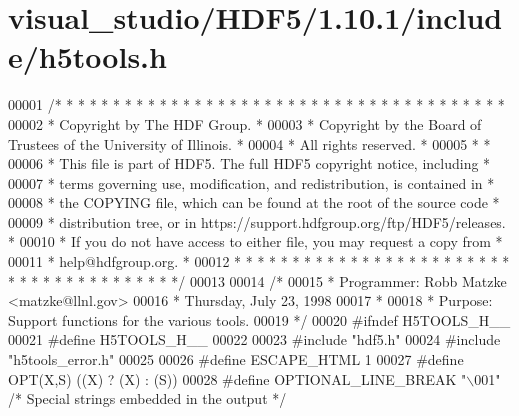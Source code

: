 \hypertarget{visual__studio_2_h_d_f5_21_810_81_2include_2h5tools_8h_source}{}\section{visual\+\_\+studio/\+H\+D\+F5/1.10.1/include/h5tools.h}
\label{visual__studio_2_h_d_f5_21_810_81_2include_2h5tools_8h_source}

\begin{DoxyCode}
00001 \textcolor{comment}{/* * * * * * * * * * * * * * * * * * * * * * * * * * * * * * * * * * * * * * *}
00002 \textcolor{comment}{ * Copyright by The HDF Group.                                               *}
00003 \textcolor{comment}{ * Copyright by the Board of Trustees of the University of Illinois.         *}
00004 \textcolor{comment}{ * All rights reserved.                                                      *}
00005 \textcolor{comment}{ *                                                                           *}
00006 \textcolor{comment}{ * This file is part of HDF5.  The full HDF5 copyright notice, including     *}
00007 \textcolor{comment}{ * terms governing use, modification, and redistribution, is contained in    *}
00008 \textcolor{comment}{ * the COPYING file, which can be found at the root of the source code       *}
00009 \textcolor{comment}{ * distribution tree, or in https://support.hdfgroup.org/ftp/HDF5/releases.  *}
00010 \textcolor{comment}{ * If you do not have access to either file, you may request a copy from     *}
00011 \textcolor{comment}{ * help@hdfgroup.org.                                                        *}
00012 \textcolor{comment}{ * * * * * * * * * * * * * * * * * * * * * * * * * * * * * * * * * * * * * * */}
00013 
00014 \textcolor{comment}{/*}
00015 \textcolor{comment}{ * Programmer:  Robb Matzke <matzke@llnl.gov>}
00016 \textcolor{comment}{ *              Thursday, July 23, 1998}
00017 \textcolor{comment}{ *}
00018 \textcolor{comment}{ * Purpose:     Support functions for the various tools.}
00019 \textcolor{comment}{ */}
00020 \textcolor{preprocessor}{#ifndef H5TOOLS\_H\_\_}
00021 \textcolor{preprocessor}{#define H5TOOLS\_H\_\_}
00022 
00023 \textcolor{preprocessor}{#include "hdf5.h"}
00024 \textcolor{preprocessor}{#include "h5tools\_error.h"}
00025 
00026 \textcolor{preprocessor}{#define ESCAPE\_HTML             1}
00027 \textcolor{preprocessor}{#define OPT(X,S)                ((X) ? (X) : (S))}
00028 \textcolor{preprocessor}{#define OPTIONAL\_LINE\_BREAK     "\(\backslash\)001"  }\textcolor{comment}{/* Special strings embedded in the output */}\textcolor{preprocessor}{}

\end{DoxyCode}
